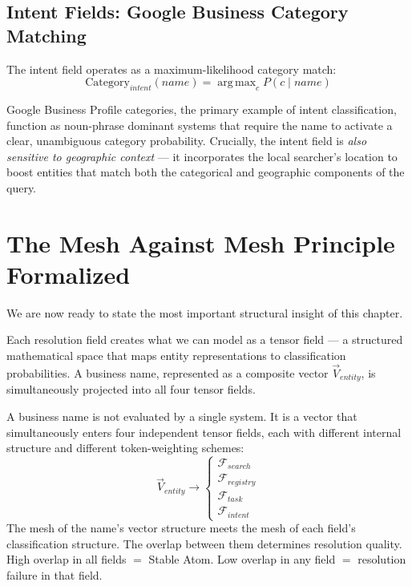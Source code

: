 \documentclass[12pt, openany]{book}
\theoremstyle{thmstyle}
\theoremstyle{defstyle}
\DeclareMathOperator*{\argmax}{arg\,max}
\begin{document}
\subsection{Intent Fields: Google Business Category Matching}

The intent field operates as a maximum-likelihood category match:
\[
\text{Category}_{intent}(name) = \argmax_c P(c \mid name)
\]

Google Business Profile categories, the primary example of intent classification, function as noun-phrase dominant systems that require the name to activate a clear, unambiguous category probability. Crucially, the intent field is \textit{also sensitive to geographic context} --- it incorporates the local searcher's location to boost entities that match both the categorical and geographic components of the query.

\section{The Mesh Against Mesh Principle Formalized}

We are now ready to state the most important structural insight of this chapter.

Each resolution field creates what we can model as a tensor field --- a structured mathematical space that maps entity representations to classification probabilities. A business name, represented as a composite vector $\vec{V}_{entity}$, is simultaneously projected into all four tensor fields.

\begin{keybox}
A business name is not evaluated by a single system. It is a vector that simultaneously enters four independent tensor fields, each with different internal structure and different token-weighting schemes:
\[
\vec{V}_{entity} \rightarrow
\begin{cases}
\mathcal{F}_{search} \\
\mathcal{F}_{registry} \\
\mathcal{F}_{task} \\
\mathcal{F}_{intent}
\end{cases}
\]
The mesh of the name's vector structure meets the mesh of each field's classification structure. The overlap between them determines resolution quality. High overlap in all fields $=$ Stable Atom. Low overlap in any field $=$ resolution failure in that field.
\end{keybox}
\end{document}
